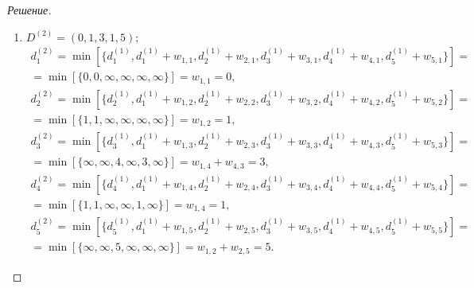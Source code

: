 \begin{proof}[Решение]
\begin{enumerate}
        \item $D^{(2)}=(0,1,3,1,5)$;
        \[
            \begin{split}
                d_1^{(2)}=\min[\{
                    d_1^{(1)},
                    d_1^{(1)}+w_{1,1},
                    d_2^{(1)}+w_{2,1},
                    d_3^{(1)}+w_{3,1},
                    d_4^{(1)}+w_{4,1},
                    d_5^{(1)}+w_{5,1}
                \}]=\\
                =\min[\{
                    0,0,\infty,\infty,\infty,\infty
                \}] = w_{1,1}=0,\\
                d_2^{(2)}=\min[\{
                    d_2^{(1)},
                    d_1^{(1)}+w_{1,2},
                    d_2^{(1)}+w_{2,2},
                    d_3^{(1)}+w_{3,2},
                    d_4^{(1)}+w_{4,2},
                    d_5^{(1)}+w_{5,2}
                \}]=\\
                =\min[\{
                    1,1,\infty,\infty,\infty,\infty
                \}] = w_{1,2}=1,\\
                d_3^{(2)}=\min[\{
                    d_3^{(1)},
                    d_1^{(1)}+w_{1,3},
                    d_2^{(1)}+w_{2,3},
                    d_3^{(1)}+w_{3,3},
                    d_4^{(1)}+w_{4,3},
                    d_5^{(1)}+w_{5,3}
                \}]=\\
                =\min[\{
                    \infty,\infty,4,\infty,3,\infty
                \}] = w_{1,4}+w_{4,3}=3,\\
                d_4^{(2)}=\min[\{
                    d_4^{(1)},
                    d_1^{(1)}+w_{1,4},
                    d_2^{(1)}+w_{2,4},
                    d_3^{(1)}+w_{3,4},
                    d_4^{(1)}+w_{4,4},
                    d_5^{(1)}+w_{5,4}
                \}]=\\
                =\min[\{
                    1,1,\infty,\infty,1,\infty
                \}] = w_{1,4}=1,\\
                d_5^{(2)}=\min[\{
                    d_5^{(1)},
                    d_1^{(1)}+w_{1,5},
                    d_2^{(1)}+w_{2,5},
                    d_3^{(1)}+w_{3,5},
                    d_4^{(1)}+w_{4,5},
                    d_5^{(1)}+w_{5,5}
                \}]=\\
                =\min[\{
                    \infty,\infty,5,\infty,\infty,\infty
                \}] = w_{1,2}+w_{2,5}=5.
            \end{split}
        \]
        

\end{enumerate}
\end{proof}
